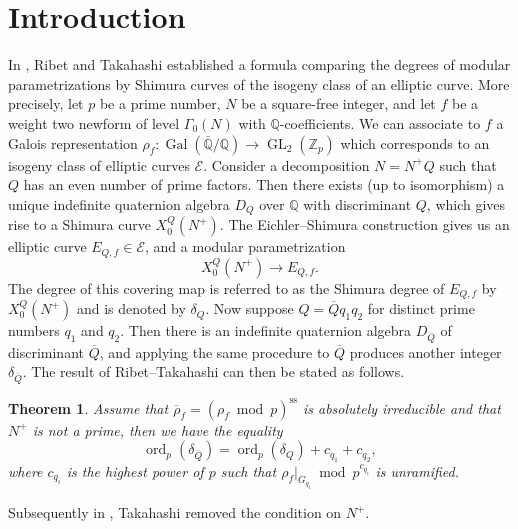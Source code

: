 \documentclass[a4paper, notitlepage, 10pt]{amsart}
\theoremstyle{plain} %
\newtheorem*{untheorem}{Theorem}
\theoremstyle{definition} %
\theoremstyle{remark} %
\numberwithin{equation}{section}
\newcommand{\bbQ}{\mathbb Q}
\newcommand{\bbZ}{\mathbb Z}
\newcommand{\GL}{\operatorname{GL}} %
\newcommand{\Gal}{\operatorname{Gal}} %
\newcommand{\ord}{\operatorname{ord}} %
\begin{document}
\section{Introduction}
In \cite{RT97}, Ribet and Takahashi established a formula comparing the degrees of modular parametrizations by Shimura curves of the isogeny class of an elliptic curve. More precisely, let $p$ be a prime number, $N$ be a square-free integer, and let $f$ be a weight two newform of level $\Gamma_0(N)$ with $\bbQ$-coefficients. We can associate to $f$ a Galois representation $\rho_f\colon \Gal(\overline{\bbQ}/\bbQ)\to \GL_2(\bbZ_p)$ which corresponds to an isogeny class of elliptic curves $\mathcal{E}$. Consider a  decomposition $N=N^+Q$ such that $Q$ has an even number of prime factors. Then there exists (up to isomorphism) a unique indefinite quaternion algebra $D_Q$ over $\bbQ$ with discriminant $Q$, which gives rise to a Shimura curve $X_0^{Q}(N^+)$. The Eichler--Shimura construction gives us an elliptic curve $E_{Q,f}\in \mathcal{E}$, and a modular parametrization
$$ X_0^Q(N^+)\longrightarrow E_{Q,f}.$$
The degree of this covering map is referred to as the Shimura degree of $E_{Q,f}$ by $X_0^Q(N^+)$ and is denoted by $\delta_Q$. Now suppose $Q=\overline{Q}q_1q_2$ for distinct prime numbers $q_1$ and $q_2$. Then there is an indefinite quaternion algebra $D_{\overline{Q}}$ of discriminant $\overline{Q}$, and applying the same procedure to $\overline{Q}$ produces another integer $\delta_{\overline{Q}}$. The result of Ribet--Takahashi can then be stated as follows.
\begin{untheorem}{\cite[Theorem 1]{RT97}}
    Assume that $\overline{\rho}_f=(\rho_f \bmod p)^{\text{ss}}$ is absolutely irreducible and that $N^+$ is not a prime, then we have the equality
    \begin{equation}\label{RTresult}
\ord_p(\delta_{\overline{Q}})=\ord_p(\delta_{Q})+c_{q_1}+c_{q_2}, 
    \end{equation}
    where $c_{q_i}$ is the highest power of $p$ such that $\rho_f|_{G_{q_i}}\bmod p^{c_{q_i}}$ is unramified. 
\end{untheorem}
Subsequently in \cite{Takahashi01}, Takahashi removed the condition on $N^+$.
\end{document}
